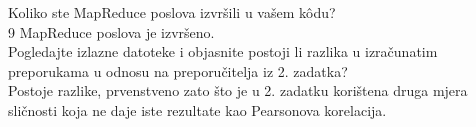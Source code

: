 \documentclass[paper=a4, fontsize=11pt]{scrartcl}
\numberwithin{equation}{section}		%
\numberwithin{figure}{section}			%
\numberwithin{table}{section}				%
\begin{document}
Koliko ste MapReduce poslova izvršili u vašem kôdu? \\
9 MapReduce poslova je izvršeno.\\

Pogledajte izlazne datoteke i objasnite postoji li razlika u izračunatim preporukama u odnosu na
preporučitelja iz 2. zadatka?\\
Postoje razlike, prvenstveno zato što je u 2. zadatku korištena druga mjera sličnosti koja ne daje iste rezultate kao Pearsonova korelacija.
\end{document}
